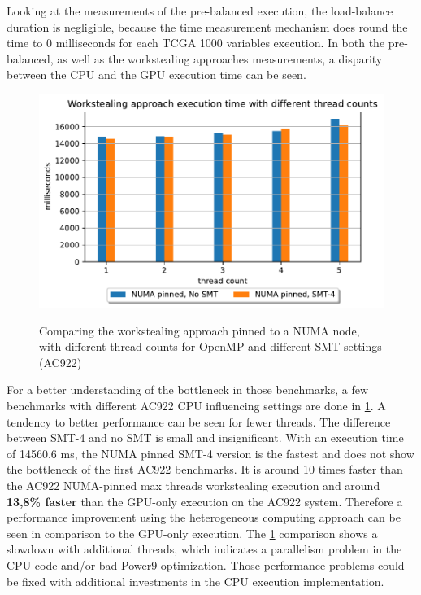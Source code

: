 Looking at the measurements of the pre-balanced execution, the load-balance duration is negligible, because the time measurement mechanism does round the time to 0 milliseconds for each TCGA 1000 variables execution. In both the pre-balanced, as well as the workstealing approaches measurements, a disparity between the CPU and the GPU execution time can be seen.

\begin{figure}[H]
  \caption{Comparing the workstealing approach pinned to a NUMA node, with different thread counts for OpenMP and different SMT settings (AC922)}
  \includegraphics[width=\textwidth]{figures/ac922_threadcount.pdf}
  \centering
  \label{fig:threadcount_ac922}
\end{figure}

For a better understanding of the bottleneck in those benchmarks, a few benchmarks with different AC922 CPU influencing settings are done in \ref{fig:threadcount_ac922}. A tendency to better performance can be seen for fewer threads. The difference between SMT-4 and no SMT is small and insignificant. With an execution time of 14560.6 ms, the NUMA pinned SMT-4 version is the fastest and does not show the bottleneck of the first AC922 benchmarks. It is around 10 times faster than the AC922 NUMA-pinned max threads workstealing execution and around \textbf{13,8\% faster} than the GPU-only execution on the AC922 system. Therefore a performance improvement using the heterogeneous computing approach can be seen in comparison to the GPU-only execution. The \ref{fig:threadcount_ac922} comparison shows a slowdown with additional threads, which indicates a parallelism problem in the CPU code and/or bad Power9 optimization. Those performance problems could be fixed with additional investments in the CPU execution implementation.

